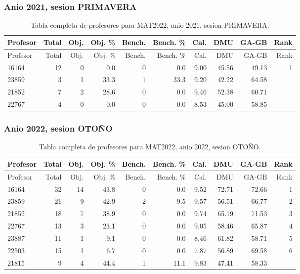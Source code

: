 \subsubsection{Anio 2021, sesion PRIMAVERA}

\begingroup
\scriptsize
\setlength{\tabcolsep}{3pt}
\begin{longtable}{lrrrrrrrrr}
\caption{Tabla completa de profesores para MAT2022, anio 2021, sesion PRIMAVERA.}\label{tab:prof-period-mat2022-2021-primavera}\\
\toprule
Profesor & Total & Obj. & Obj. \% & Bench. & Bench. \% & Cal. & DMU & GA-GB & Rank \\
\midrule
\endfirsthead
\toprule
Profesor & Total & Obj. & Obj. \% & Bench. & Bench. \% & Cal. & DMU & GA-GB & Rank \\
\midrule
\endhead
16164 & 12 & 0 & 0.0 & 0 & 0.0 & 9.00 & 45.56 & 49.13 & 1 \\
23859 & 3 & 1 & 33.3 & 1 & 33.3 & 9.20 & 42.22 & 64.58 &  \\
21852 & 7 & 2 & 28.6 & 0 & 0.0 & 9.46 & 52.38 & 60.71 &  \\
22767 & 4 & 0 & 0.0 & 0 & 0.0 & 8.53 & 45.00 & 58.85 &  \\
\bottomrule
\end{longtable}
\endgroup

\subsubsection{Anio 2022, sesion OTOÑO}

\begingroup
\scriptsize
\setlength{\tabcolsep}{3pt}
\begin{longtable}{lrrrrrrrrr}
\caption{Tabla completa de profesores para MAT2022, anio 2022, sesion OTOÑO.}\label{tab:prof-period-mat2022-2022-oto-o}\\
\toprule
Profesor & Total & Obj. & Obj. \% & Bench. & Bench. \% & Cal. & DMU & GA-GB & Rank \\
\midrule
\endfirsthead
\toprule
Profesor & Total & Obj. & Obj. \% & Bench. & Bench. \% & Cal. & DMU & GA-GB & Rank \\
\midrule
\endhead
16164 & 32 & 14 & 43.8 & 0 & 0.0 & 9.52 & 72.71 & 72.66 & 1 \\
23859 & 21 & 9 & 42.9 & 2 & 9.5 & 9.57 & 56.51 & 66.77 & 2 \\
21852 & 18 & 7 & 38.9 & 0 & 0.0 & 9.74 & 65.19 & 71.53 & 3 \\
22767 & 13 & 3 & 23.1 & 0 & 0.0 & 9.05 & 58.46 & 65.87 & 4 \\
23887 & 11 & 1 & 9.1 & 0 & 0.0 & 8.46 & 61.82 & 58.71 & 5 \\
22503 & 15 & 1 & 6.7 & 0 & 0.0 & 7.87 & 56.89 & 69.58 & 6 \\
21815 & 9 & 4 & 44.4 & 1 & 11.1 & 9.83 & 47.41 & 58.33 &  \\
\bottomrule
\end{longtable}
\endgroup

